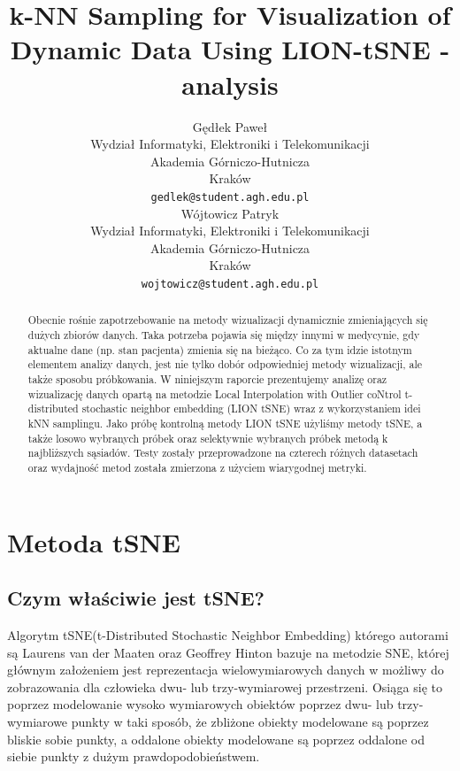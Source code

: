 \documentclass{article}
\title{k-NN Sampling for Visualization of Dynamic Data Using LION-tSNE - analysis}
\author{
 Gędłek Paweł \\
  Wydział Informatyki, Elektroniki i Telekomunikacji\\
  Akademia Górniczo-Hutnicza \\
  Kraków \\
  \texttt{gedlek@student.agh.edu.pl} \\
  \And
Wójtowicz Patryk \\
  Wydział Informatyki, Elektroniki i Telekomunikacji\\
  Akademia Górniczo-Hutnicza \\
  Kraków \\
  \texttt{wojtowicz@student.agh.edu.pl} \\
}
\begin{document}
\maketitle
\begin{abstract}

Obecnie rośnie zapotrzebowanie na metody wizualizacji dynamicznie zmieniających się dużych zbiorów danych. Taka potrzeba pojawia się między innymi w medycynie, gdy aktualne dane (np. stan pacjenta) zmienia się na bieżąco. Co za tym idzie istotnym elementem analizy danych, jest nie tylko dobór odpowiedniej metody wizualizacji, ale także sposobu próbkowania. W niniejszym raporcie prezentujemy analizę oraz wizualizację danych opartą na metodzie Local Interpolation with Outlier coNtrol t-distributed stochastic neighbor embedding (LION tSNE) wraz z wykorzystaniem idei kNN samplingu. Jako próbę kontrolną metody LION tSNE użyliśmy metody tSNE, a także losowo wybranych próbek oraz selektywnie wybranych próbek metodą k najbliższych sąsiadów. Testy zostały przeprowadzone na czterech różnych datasetach oraz wydajność metod została zmierzona z użyciem wiarygodnej metryki.

\end{abstract}



\tableofcontents

\section{Metoda tSNE}
\label{sec:tSNE}
\paragraph{}
\subsection{Czym właściwie jest tSNE?}
Algorytm tSNE(t-Distributed Stochastic Neighbor Embedding) którego autorami są Laurens van der Maaten oraz Geoffrey Hinton bazuje na metodzie SNE, której głównym założeniem jest reprezentacja wielowymiarowych danych w możliwy do zobrazowania dla człowieka dwu- lub trzy-wymiarowej przestrzeni. Osiąga się to poprzez modelowanie wysoko wymiarowych obiektów poprzez dwu- lub trzy-wymiarowe punkty w taki sposób, że zbliżone obiekty modelowane są poprzez bliskie sobie punkty, a oddalone obiekty modelowane są poprzez oddalone od siebie punkty z dużym prawdopodobieństwem. 
        
\end{document}
